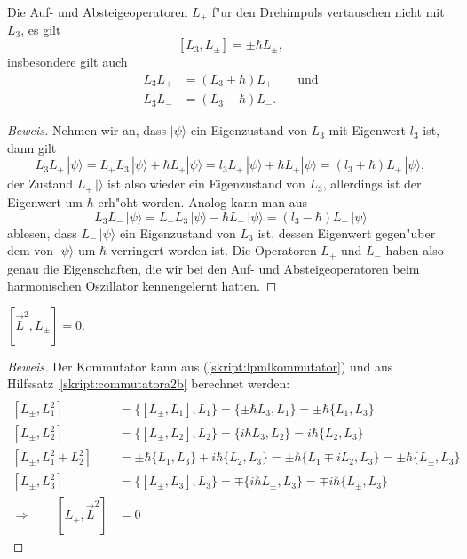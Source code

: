 \begin{hilfssatz}
Die Auf- und Absteigeoperatoren $L_\pm$ f"ur den Drehimpuls vertauschen 
nicht mit $L_3$, es gilt
\[
[L_3,L_\pm]=\pm\hbar L_{\pm},
\]
insbesondere gilt auch
\begin{align*}
L_3L_+&=(L_3+\hbar)L_+\qquad\text{und}\\
L_3L_-&=(L_3-\hbar)L_-.
\end{align*}
\label{skript:laufab}
\end{hilfssatz}

\begin{proof}[Beweis]
Nehmen wir an, dass $|\psi\rangle$ ein Eigenzustand von $L_3$ mit
Eigenwert $l_3$ ist, dann gilt
\[
L_3L_+\,|\psi\rangle
=
L_+L_3\,|\psi\rangle+\hbar L_+|\psi\rangle
=
l_3L_+\,|\psi\rangle+\hbar L_+|\psi\rangle
=
(l_3+\hbar)L_+\,|\psi\rangle,
\]
der Zustand $L_+\,|\rangle$ ist also wieder ein Eigenzustand von $L_3$,
allerdings ist der Eigenwert um $\hbar$ erh"oht worden.
Analog kann man aus
\[
L_3L_-\,|\psi\rangle
=
L_-L_3\,|\psi\rangle-\hbar L_-\,|\psi\rangle
=
(l_3-\hbar)L_-\,|\psi\rangle
\]
ablesen,  dass $L_-\,|\psi\rangle$ ein Eigenzustand von $L_3$ ist, dessen
Eigenwert gegen"uber dem von $|\psi\rangle$ um $\hbar$ verringert
worden ist.
Die Operatoren $L_+$ und $L_-$ haben also genau die Eigenschaften,
die wir bei den Auf- und Absteigeoperatoren beim harmonischen Oszillator
kennengelernt hatten.
\end{proof}

\begin{hilfssatz}
$[\vec L^2,L_\pm]=0.$
\end{hilfssatz}

\begin{proof}[Beweis]
Der Kommutator kann
aus (\ref{skript:lpmlkommutator}) und aus
Hilfssatz~\ref{skript:commutatora2b} berechnet werden:
\begin{align*}
\\
[L_\pm,L_1^2]
&=
\{ [L_\pm, L_1], L_1 \}
=
\{ \pm \hbar L_3, L_1 \}
=
\pm \hbar \{ L_1, L_3 \}
\\
[L_\pm,L_2^2]
&=
\{ [L_\pm, L_2], L_2 \}
=
\{ i\hbar L_3, L_2 \}
=
i\hbar \{ L_2, L_3 \}
\\
[L_\pm,L_1^2 + L_2^2]
&=
\pm \hbar \{ L_1, L_3 \}
+
i\hbar \{ L_2, L_3 \}
=
\pm \hbar \{ L_1 \mp iL_2, L_3 \}
=
\pm \hbar\{L_\pm, L_3\}
\\
[L_\pm,L_3^2]
&=
\{ [L_\pm, L_3], L_3 \}
=
\mp \{ i\hbar L_\pm, L_3 \}
=
\mp i\hbar \{ L_\pm, L_3 \}
\\
\Rightarrow\qquad [L_\pm,\vec L^2]
&=0
\end{align*}
\end{proof}

